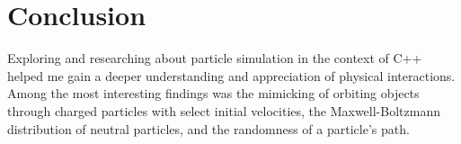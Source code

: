 \documentclass{article}
\begin{document}
\section{Conclusion}
Exploring and researching about particle simulation in the context of C++
helped me gain a deeper understanding and appreciation of physical interactions.
Among the most interesting findings was the mimicking of orbiting
objects through charged particles with select initial velocities,
the Maxwell-Boltzmann distribution of neutral particles,
and the randomness of a particle's path.
\end{document}

